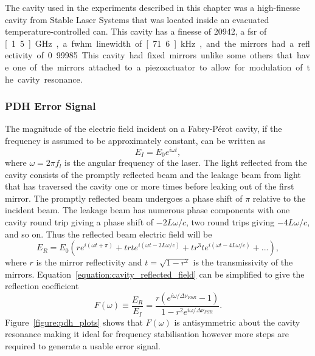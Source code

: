 The cavity used in the experiments described in this chapter was a high-finesse cavity from Stable Laser Systems that was located inside an evacuated temperature-controlled can.
This cavity has a finesse of 20942, a \gls{fsr} of \unit[1.5]{GHz}, a \gls{fwhm} linewidth of \unit[71.6]{kHz}, and the mirrors had a reflectivity of 0.99985.
This cavity had fixed mirrors unlike some others that have one of the mirrors attached to a piezoactuator to allow for modulation of the cavity resonance.

\subsubsection{PDH Error Signal}\label{section:pdh_error}

The magnitude of the electric field incident on a Fabry-P\'erot cavity, if the frequency is assumed to be approximately constant, can be written as
\begin{equation}
E_{I} = E_0 e^{i\omega t},
\end{equation}
where $\omega=2\pi f_l$ is the angular frequency of the laser.
The light reflected from the cavity consists of the promptly reflected beam and the leakage beam from light that has traversed the cavity one or more times before leaking out of the first mirror.
The promptly reflected beam undergoes a phase shift of $\pi$ relative to the incident beam.
The leakage beam has numerous phase components with one cavity round trip giving a phase shift of $-2L\omega/c$, two round trips giving $-4L\omega/c$, and so on.
Thus the reflected beam electric field will be
\begin{equation}\label{equation:cavity_reflected_field}
E_R = E_0 \left( r e^{i\left(\omega t + \pi\right)} + t r t e^{i\left(\omega t -2L\omega/c\right)} + t r^3 t e^{i\left(\omega t -4L\omega/c\right)} + ...\right),
\end{equation}
where $r$ is the mirror reflectivity and $t=\sqrt{1-r^2}$ is the transmissivity of the mirrors.
Equation~\ref{equation:cavity_reflected_field} can be simplified to give the reflection coefficient
\begin{equation}\label{equation:reflection_coefficient}
F(\omega) \equiv \frac{E_R}{E_I} = \frac{r\left(e^{i\omega / \Delta\nu_{FSR}} - 1 \right)}{1-r^2 e^{i\omega / \Delta\nu_{FSR}}}.
\end{equation}
Figure~\ref{figure:pdh_plots} shows that $F(\omega)$ is antisymmetric about the cavity resonance making it ideal for frequency stabilisation however more steps are required to generate a usable error signal.

